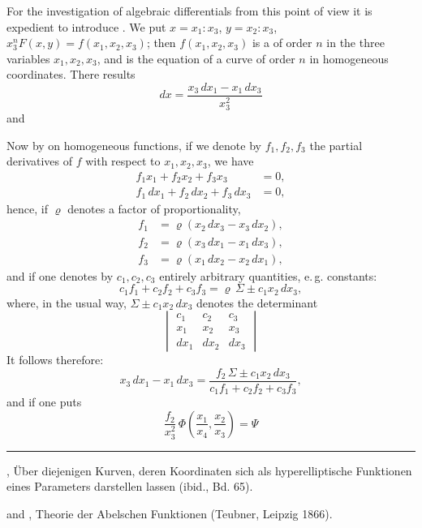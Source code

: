 
For the investigation of algebraic differentials from this point of view it is
expedient to introduce . We put $x = x_1{:}x_3$, $y = x_2{:}x_3$,
$x_3^n F(x,y) = f(x_1,x_2,x_3)$; then $f(x_1,x_2,x_3)$ is a  of
order $n$ in the three variables $x_1, x_2, x_3$, and
is the equation of a curve of order $n$ in homogeneous coordinates. There results
\[
dx = \frac{x_3\,dx_1 - x_1\,dx_3}{x_3^2}
\]
and

Now by  on homogeneous functions, if we denote by
$f_1, f_2, f_3$ the partial derivatives of $f$ with respect to
$x_1, x_2, x_3$, we have
\[
\begin{aligned}
f_1x_1 + f_2x_2 + f_3x_3 &= 0,\\
f_1\,dx_1 + f_2\,dx_2 + f_3\,dx_3 &= 0,
\end{aligned}
\]
hence, if $\varrho$ denotes a factor of proportionality,
\[
\begin{aligned}
f_1 &= \varrho(x_2\,dx_3 - x_3\,dx_2),\\
f_2 &= \varrho(x_3\,dx_1 - x_1\,dx_3),\\
f_3 &= \varrho(x_1\,dx_2 - x_2\,dx_1),
\end{aligned}
\]
and if one denotes by $c_1, c_2, c_3$ entirely arbitrary quantities, e.\,g. constants:
\[
c_1f_1 + c_2f_2 + c_3f_3 = \varrho\,\Sigma \pm c_1x_2\,dx_3,
\]
where, in the usual way, $\Sigma \pm c_1x_2\,dx_3$ denotes the determinant
\[
\begin{vmatrix} c_1 & c_2 & c_3 \\ x_1 & x_2 & x_3 \\ dx_1 & dx_2 & dx_3 \end{vmatrix}
\]
It follows therefore:
\[
x_3\,dx_1 - x_1\,dx_3 = \frac{f_2\,\Sigma \pm c_1x_2\,dx_3}{c_1f_1 + c_2f_2 + c_3f_3},
\]
and if one puts
\[
\frac{f_2}{x_3^2}\,\Phi\!\left(\frac{x_1}{x_4}, \frac{x_2}{x_3}\right) = \Psi
\]


\begin{center}\rule{2cm}{0.4pt}\end{center}
, Über diejenigen Kurven, deren Koordinaten sich als hyperelliptische Funktionen eines Parameters darstellen lassen (ibid., Bd. 65).

 and , Theorie der Abelschen Funktionen (Teubner, Leipzig 1866).
